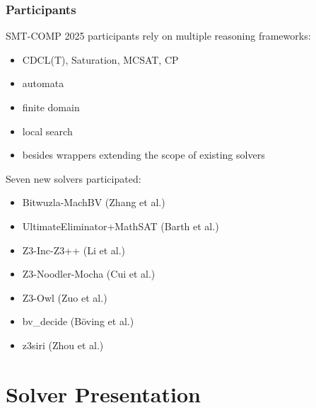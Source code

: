 \documentclass[table]{beamer}
\begin{document}
\begin{frame}
  \frametitle{Participants}

  SMT-COMP 2025 participants rely on multiple reasoning frameworks:
  \begin{itemize}
  \item CDCL(T), Saturation, MCSAT, CP
  \item automata
  \item finite domain
  \item local search
  \item besides wrappers extending the scope of existing solvers
  \end{itemize}

  \bigskip
  Seven new solvers participated:
  \begin{itemize}
\item Bitwuzla-MachBV {\footnotesize (Zhang et al.)}
\item UltimateEliminator+MathSAT {\footnotesize (Barth et al.)}
\item Z3-Inc-Z3++ {\footnotesize (Li et al.)}
\item Z3-Noodler-Mocha {\footnotesize (Cui et al.)}
\item Z3-Owl {\footnotesize (Zuo et al.)}
\item bv\_decide {\footnotesize (Böving et al.)}
\item z3siri {\footnotesize (Zhou et al.)}
\end{itemize}

\end{frame}

\section{Solver Presentation}

\newcommand{\myincludepdf}[1]{
\begin{frame}
  \vspace*{-1pt}%
  \noindent\makebox[\textwidth]{%
    \texttt{[image: \#1]}}
\end{frame}
}
\end{document}
